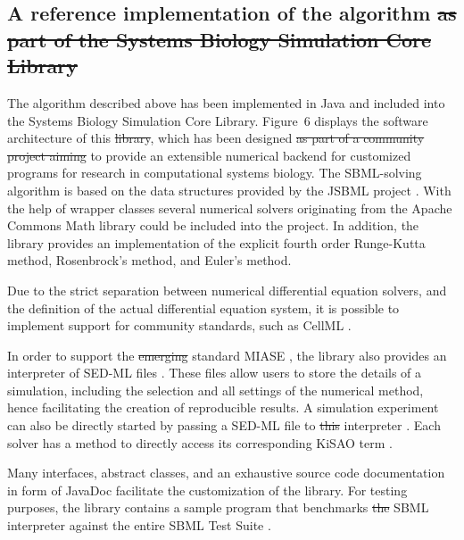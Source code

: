 \documentclass[10pt]{bmc_article}
\newenvironment{bmcformat}{\begin{raggedright}\baselineskip20pt\sloppy\setboolean{publ}{false}}{\end{raggedright}\baselineskip20pt\sloppy}
\begin{document}
\begin{bmcformat}
\subsection*{A reference implementation of the algorithm \sout{as part of the Systems
Biology Simulation Core Library}}

The algorithm described above has been implemented in Java\texttrademark{} and
included into the Systems Biology Simulation Core Library.
Figure~6 displays  the software architecture of this
\sout{library}, which has been designed 
\sout{as part of a community project aiming}
to provide an extensible numerical backend for customized programs for research
in computational systems biology.
The \acs{SBML}-solving algorithm is based on the data structures provided by the
JSBML project \cite{Draeger2008}.
With the help of wrapper classes several numerical solvers originating from the
Apache Commons Math library  could be included
into the project.
In addition, the library provides an implementation of the explicit fourth order
Runge-Kutta method, Rosenbrock's method, and Euler's method.

Due to the strict separation between numerical differential equation solvers,
and the definition of the actual differential equation system, it is possible to
implement support for  community standards, such as CellML
\cite{Lloyd2004}.

In order to support the \sout{emerging} standard \acf{MIASE}
\cite{Waltemath2011a}, the library also provides an interpreter of \acf{SED-ML}
files \cite{Waltemath2011}.
These files allow users to store the details of a simulation, including the
selection and all settings of the numerical method, hence facilitating the
creation of reproducible results.
A simulation experiment can also be directly started by passing a \acs{SED-ML}
file to \sout{this} interpreter .
Each solver has a method to directly access its corresponding \acf{KiSAO} term
\cite{Courtot2011} .

Many interfaces, abstract classes, and an exhaustive source code documentation
in  form of JavaDoc facilitate the customization of the library.
For testing purposes, the library contains a sample program that benchmarks
\sout{the} \acs{SBML} interpreter against the entire SBML Test Suite
.


\end{bmcformat}
\end{document}
